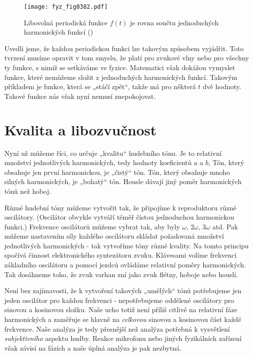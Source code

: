   \begin{figure}[ht!] %
    \centering
    \texttt{[image: fyz\_fig0382.pdf]}
    \caption{Libovolná periodická funkce \(f(t)\) je rovna součtu jednoduchých harmonických funkcí
             (\cite[s.~675]{Feynman01})}
    \label{fyz:fig0382}
  \end{figure}
  
  Uvedli jsme, že každou periodickou funkci lze takovým způsobem vyjádřit. Toto tvrzení musíme 
  opravit v tom smyslu, že platí pro zvukové vlny nebo pro všechny ty funkce, s nimiž se setkáváme 
  ve fyzice. Matematici však dokážou vymyslet funkce, které nemůžeme složit z jednoduchých 
  harmonických funkcí. Takovým příkladem je funkce, která se „stáčí zpět“, takže má pro některá 
  \(t\) dvě hodnoty. Takové funkce nás však nyní nemusí znepokojovat.
  
\section{Kvalita a libozvučnost}\label{fyz:IchapLsecIII}
  Nyní už můžeme říci, co určuje „kvalitu“ hudebního tónu. Je to relativní množství jednotlivých 
  harmonických, tedy hodnoty koeficientů \(a\) a \(b\), Tón, který obsahuje jen první harmonickou, 
  je „čistý“ tón. Tón, který obsahuje mnoho silných harmonických, je „bohatý“ tón. Housle dávají 
  jiný poměr harmonických tónů než hoboj.
  
  Různé hudební tóny můžeme vytvořit tak, že připojíme k reproduktoru různé oscilátory. (Oscilátor 
  obvykle vytváří téměř čistou jednoduchou harmonickou funkci.) Frekvence oscilátorů můžeme vybrat 
  tak, aby byly \(\omega\), \(2\omega\), \(3\omega\) atd. Pak můžeme nastavením síly každého 
  oscilátoru skládat požadovaná množství jednotlivých harmonických - tak vytvoříme tóny různé 
  kvality. Na tomto principu spočívá činnost elektronického syntezátoru zvuku. Klávesami volíme 
  frekvenci základního oscilátoru a pomocí jezdců ovládáme relativní poměry harmonických. Tak 
  dosáhneme toho, že zvuk varhan zní jako zvuk flétny, hoboje nebo houslí.
  
  Není bez zajímavosti, že k vytvoření takových „umělých“ tónů potřebujeme jen jeden oscilátor pro 
  každou frekvenci - nepotřebujeme oddělené oscilátory pro sinovou a kosinovou složku. Naše ucho 
  totiž není příliš citlivé na relativní fáze harmonických a zaměřuje se hlavně na \emph{celkovou} 
  sinovou a kosinovou část každé frekvence. Naše analýza je tedy přesnější než analýza potřebná 
  k vysvětlení \emph{subjektivního} aspektu hudby. Reakce mikrofonu nebo jiných fyzikálních 
  zařízení však závisí na fázích a naše úplná analýza je pak nezbytná. 
  
